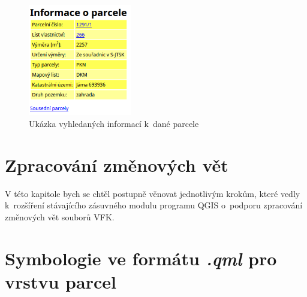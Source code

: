 \documentclass[a4paper,12pt,oneside]{book}
\begin{document}
\begin{figure}[htb]
\centering
\includegraphics[width=0.4\textwidth]{images/vfkPlugin-informace_o_parcele.png}
\caption[Ukázka vyhledaných informací k dané parcele]{Ukázka vyhledaných informací k~dané parcele}
\label{l_informace_o_parcele}
\end{figure}



\clearpage
\chapter{Zpracování změnových vět}
V této kapitole bych se chtěl postupně věnovat jednotlivým krokům, které vedly k~rozšíření stávajícího zásuvného modulu programu QGIS o~podporu zpracování změnových vět souborů VFK.




\clearpage
\rhead{{\rightmark}}		%
\renewcommand{\refname}{Použitá literatura}



\clearpage
\listoffigures

\clearpage
\listoftables

\newpage
\appendix

\setcounter{page}{1}   	%

\chapter{Symbologie ve formátu \textit{.qml} pro vrstvu parcel}
\label{l_priloha_symbologie}
\end{document}
